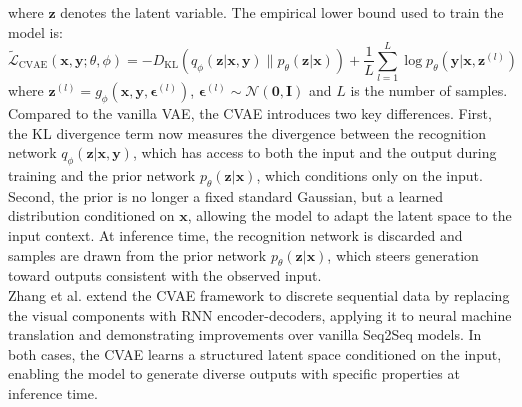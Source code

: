 \documentclass[Main.tex]{subfiles}
\begin{document}
where $\mathbf{z}$ denotes the latent variable. The empirical lower bound used to train the model is:
\begin{equation}
\tilde{\mathcal{L}}_{\text{CVAE}}(\mathbf{x}, \mathbf{y}; \theta, \phi) = -D_{\text{KL}}\left(q_\phi(\mathbf{z}|\mathbf{x}, \mathbf{y}) \| p_\theta(\mathbf{z}|\mathbf{x})\right) + \frac{1}{L}\sum_{l=1}^{L} \log p_\theta(\mathbf{y}|\mathbf{x}, \mathbf{z}^{(l)})
\end{equation}
where $\mathbf{z}^{(l)} = g_\phi(\mathbf{x}, \mathbf{y}, \boldsymbol{\epsilon}^{(l)})$, $\boldsymbol{\epsilon}^{(l)} \sim \mathcal{N}(\boldsymbol{0}, \mathbf{I})$ and $L$ is the number of samples.\\

Compared to the vanilla VAE, the CVAE introduces two key differences. First, the KL divergence term now measures the divergence between the recognition network $q_\phi(\mathbf{z}|\mathbf{x}, \mathbf{y})$, which has access to both the input and the output during training and the prior network $p_\theta(\mathbf{z}|\mathbf{x})$, which conditions only on the input. Second, the prior is no longer a fixed standard Gaussian, but a learned distribution conditioned on $\mathbf{x}$, allowing the model to adapt the latent space to the input context. At inference time, the recognition network is discarded and samples are drawn from the prior network $p_\theta(\mathbf{z}|\mathbf{x})$, which steers generation toward outputs consistent with the observed input.\\




Zhang et al. \cite{zhang_variational_2016} extend the CVAE framework to discrete sequential data by replacing the visual components with RNN encoder-decoders, applying it to neural machine translation and demonstrating improvements over vanilla Seq2Seq models. In both cases, the CVAE learns a structured latent space conditioned on the input, enabling the model to generate diverse outputs with specific properties at inference time.\\
\end{document}
